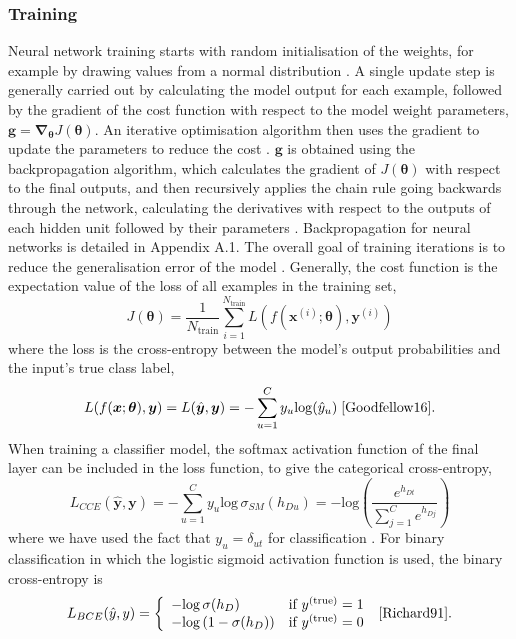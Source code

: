 \documentclass[12pt]{article}
\begin{document}
\subsubsection{Training}
Neural network training starts with random initialisation of the weights, for example by drawing values from a normal distribution \cite{Goodfellow16}. A single update step is generally carried out by calculating the model output for each example, followed by the gradient of the cost function with respect to the model weight parameters, $\bm{g}=\bm\nabla_{\bm\theta}J(\bm\theta)$. An iterative optimisation algorithm then uses the gradient to update the parameters to reduce the cost \cite{Goodfellow16}. $\bm{g}$ is obtained using the backpropagation algorithm, which calculates the gradient of $J(\bm\theta)$ with respect to the final outputs, and then recursively applies the chain rule going backwards through the network, calculating the derivatives with respect to the outputs of each hidden unit followed by their parameters \cite{Haykin98}. Backpropagation for neural networks is detailed in Appendix A.1. The overall goal of training iterations is to reduce the generalisation error of the model \cite{Goodfellow16}. Generally, the cost function is the expectation value of the loss of all examples in the training set,
\begin{equation}
J(\bm\theta)=\frac{1}{N_{\mathrm{train}}}\sum_{i=1}^{N_{\mathrm{train}}}L(f(\bm{x}^{(i)};\bm\theta),\bm{y}^{(i)})
\end{equation}
where the loss is the cross-entropy between the model's output probabilities and the input's true class label,
\begin{equation}
L(f(\bm{x};\bm\theta),\bm{y})=L(\hat{\bm{y}},\bm{y})=-\sum_{u=1}^Cy_u\mathrm{log}(\hat{y}_u)\; \cite{Goodfellow16}.
\end{equation}
When training a classifier model, the softmax activation function of the final layer can be included in the loss function, to give the categorical cross-entropy,
\begin{equation}
L_{CCE}(\hat{\bm{y}},\bm{y})=-\sum_{u=1}^Cy_u\mathrm{log}\,\sigma_{SM}(h_{Du})=-\mathrm{log}\left(\frac{e^{h_{Dt}}}{\sum_{j=1}^{C}e^{h_{Dj}}}\right)
\end{equation}
where we have used the fact that $y_u=\delta_{ut}$ for classification \cite{Kline05}. For binary classification in which the logistic sigmoid activation function is used, the binary cross-entropy is
\begin{equation}
L_{BCE}(\hat{y},y)=
\left\{
\begin{array}{ll}
-\mathrm{log}\,\sigma(h_D) & \mbox{if } y^{(\mathrm{true})}=1 \\
-\mathrm{log}\left(1-\sigma(h_D)\right) & \mbox{if } y^{(\mathrm{true})}=0
\end{array}
\right.\;\cite{Richard91}.
\end{equation}
\end{document}
